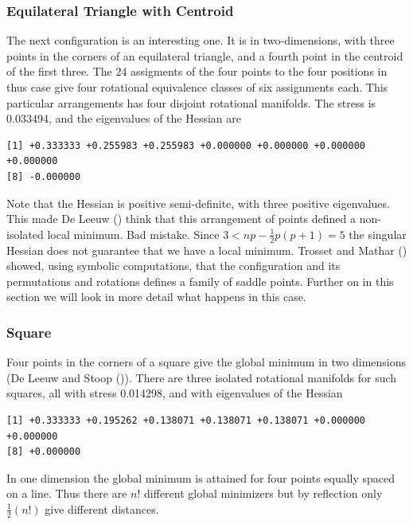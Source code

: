 \documentclass[
  12pt,
  letterpaper,
  DIV=11,
  numbers=noendperiod]{scrreprt}
\theoremstyle{remark}
\begin{document}
\subsubsection{Equilateral Triangle with
Centroid}\label{equilateral-triangle-with-centroid}

The next configuration is an interesting one. It is in two-dimensions,
with three points in the corners of an equilateral triangle, and a
fourth point in the centroid of the first three. The 24 assigments of
the four points to the four positions in thus case give four rotational
equivalence classes of six assignments each. This particular
arrangements has four disjoint rotational manifolds. The stress is
0.033494, and the eigenvalues of the Hessian are

\begin{verbatim}
[1] +0.333333 +0.255983 +0.255983 +0.000000 +0.000000 +0.000000 +0.000000
[8] -0.000000
\end{verbatim}

Note that the Hessian is positive semi-definite, with three positive
eigenvalues. This made De Leeuw ()
think that this arrangement of points defined a non-isolated local
minimum. Bad mistake. Since \(3 < np - \frac12p(p+1) = 5\) the singular
Hessian does not guarantee that we have a local minimum. Trosset and
Mathar () showed, using symbolic
computations, that the configuration and its permutations and rotations
defines a family of saddle points. Further on in this section we will
look in more detail what happens in this case.

\subsubsection{Square}\label{square}

Four points in the corners of a square give the global minimum in two
dimensions (De Leeuw and Stoop
()). There are three isolated
rotational manifolds for such squares, all with stress 0.014298, and
with eigenvalues of the Hessian

\begin{verbatim}
[1] +0.333333 +0.195262 +0.138071 +0.138071 +0.138071 +0.000000 +0.000000
[8] +0.000000
\end{verbatim}

In one dimension the global minimum is attained for four points equally
spaced on a line. Thus there are \(n!\) different global minimizers but
by reflection only \(\frac12(n!)\) give different distances.
\end{document}
